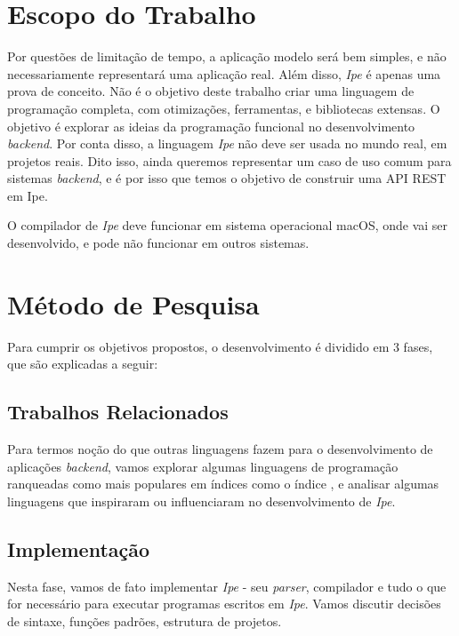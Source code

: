 \section{Escopo do Trabalho}

Por questões de limitação de tempo, a aplicação modelo será bem simples, e não
necessariamente representará uma aplicação real. Além disso, \textit{Ipe} é apenas
uma prova de conceito. Não é o objetivo deste trabalho criar uma linguagem de
programação completa, com otimizações, ferramentas, e bibliotecas extensas. O
objetivo é explorar as ideias da programação funcional no desenvolvimento
\textit{backend}. Por conta disso, a linguagem \textit{Ipe} não deve ser usada
no mundo real, em projetos reais. Dito isso, ainda queremos representar um caso
de uso comum para sistemas \textit{backend}, e é por isso que temos o objetivo
de construir uma API REST em Ipe.

O compilador de \textit{Ipe} deve funcionar em sistema operacional macOS, onde
vai ser desenvolvido, e pode não funcionar em outros sistemas.

\section{Método de Pesquisa}

Para cumprir os objetivos propostos, o desenvolvimento é dividido em 3 fases, que
são explicadas a seguir:

\subsection{Trabalhos Relacionados}

Para termos noção do que outras linguagens fazem para o desenvolvimento de
aplicações \textit{backend}, vamos explorar algumas linguagens de programação
ranqueadas como mais populares em índices como o índice \textcite{tiobeindex}, e analisar algumas
linguagens que inspiraram ou influenciaram no desenvolvimento de \textit{Ipe}.

\subsection{Implementação}

Nesta fase, vamos de fato implementar \textit{Ipe} - seu \textit{parser}, compilador
e tudo o que for necessário para executar programas escritos em \textit{Ipe}.
Vamos discutir decisões de sintaxe, funções padrões, estrutura de projetos.

